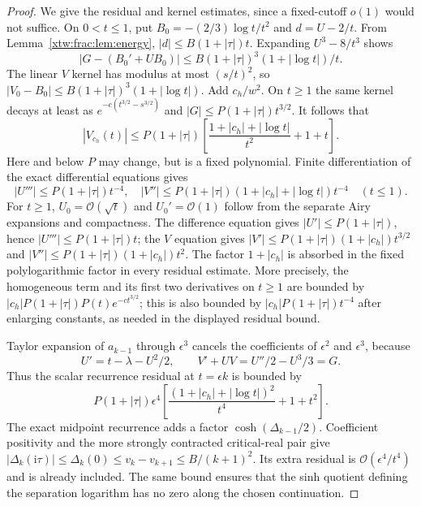 \documentclass[11pt]{article}
\theoremstyle{remark}\newtheorem{remark}[theorem]{Remark}
\newcommand{\OO}{\mathcal O}
\newcommand{\ii}{\mathrm i}
\begin{document}
\begin{proof}
We give the residual and kernel estimates, since a fixed-cutoff $o(1)$ would
not suffice. On $0<t\le1$, put $B_0=-(2/3)\log t/t^2$ and
$d=U-2/t$. From Lemma~\ref{xtw:frac:lem:energy},
$|d|\le B(1+|\tau|)t$. Expanding $U^3-8/t^3$ shows
\[
 |G-(B_0'+UB_0)|\le B(1+|\tau|)^3(1+|\log t|)/t.
\]
The linear $V$ kernel has modulus at most $(s/t)^2$, so
$|V_0-B_0|\le B(1+|\tau|)^3(1+|\log t|)$.
Add $c_h/w^2$. On $t\ge1$ the same kernel decays at least as
$e^{-c(t^{3/2}-s^{3/2})}$ and $|G|\le P(1+|\tau|)t^{3/2}$.
It follows that
\begin{equation}\label{xtw:frac:eq:Vbound}
 |V_{c_h}(t)|\le P(1+|\tau|)
 \left[\frac{1+|c_h|+|\log t|}{t^2}+1+t\right].
\end{equation}
Here and below $P$ may change, but is a fixed polynomial. Finite
differentiation of the exact differential equations gives
\[
 |U'''|\le P(1+|\tau|)t^{-4},\quad
 |V''|\le P(1+|\tau|)(1+|c_h|+|\log t|)t^{-4}\quad(t\le1).
\]
For $t\ge1$, $U_0=\OO(\sqrt t)$ and $U_0'=\OO(1)$ follow from the
separate Airy expansions and compactness. The difference equation gives
$|U'|\le P(1+|\tau|)$, hence $|U'''|\le P(1+|\tau|)t$;
the $V$ equation gives $|V'|\le P(1+|\tau|)(1+|c_h|)t^{3/2}$ and
$|V''|\le P(1+|\tau|)(1+|c_h|)t^2$. The factor $1+|c_h|$
is absorbed in the fixed polylogarithmic factor in every residual estimate.
More precisely, the homogeneous term and its first two derivatives on
$t\ge1$ are bounded by $|c_h|P(1+|\tau|)P(t)e^{-ct^{3/2}}$;
this is also bounded by $|c_h|P(1+|\tau|)t^{-4}$ after enlarging
constants, as needed in the displayed residual bound.

Taylor expansion of $a_{k-1}$ through $\epsilon^3$ cancels the coefficients
of $\epsilon^2$ and $\epsilon^3$, because
\[
 U'=t-\lambda-U^2/2,\qquad
 V'+UV=U''/2-U^3/3=G.
\]
Thus the scalar recurrence residual at $t=\epsilon k$ is bounded by
\begin{equation}\label{xtw:frac:eq:innerresidual}
 P(1+|\tau|)\epsilon^4
 \left[\frac{(1+|c_h|+|\log t|)^2}{t^4}+1+t^2\right].
\end{equation}
The exact midpoint recurrence adds a factor
$\cosh(\Delta_{k-1}/2)$. Coefficient positivity and the more strongly
contracted critical-real pair give
$|\Delta_k(\ii\tau)|\le\Delta_k(0)\le v_k-v_{k+1}\le B/(k+1)^2$.
Its extra residual is $\OO(\epsilon^4/t^4)$ and is already included.
The same bound ensures that the sinh quotient defining the separation
logarithm has no zero along the chosen continuation.


\end{proof}
\end{document}
